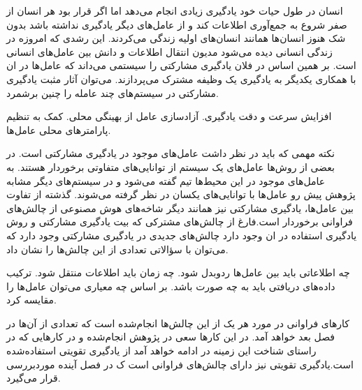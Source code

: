 انسان در طول حیات خود یادگیری زیادی انجام می‌دهد اما اگر قرار بود هر انسان از  صفر شروع به جمع‌آوری اطلاعات کند و از عامل‌های دیگر یادگیری نداشته باشد بدون شک هنوز انسان‌ها همانند انسان‌های اولیه زندگی می‌کردند. این رشدی که امروزه در زندگی انسانی دیده می‌شود مدیون انتقال اطلاعات و دانش بین عامل‌های انسانی است. بر همین اساس در فلان یادگیری مشارکتی را سیستمی می‌داند که عامل‌ها در ان با همکاری یکدیگر به یادگیری یک وظیفه مشترک می‌پردازند. می‌توان آثار مثبت یادگیری مشارکتی در سیستم‌های چند عامله را چنین برشمرد.

\begin{itemize}\setlength\itemsep{-.5em}
 افزایش سرعت و دقت یادگیری.
 آزادسازی عامل از بهینگی محلی.
 کمک به تنظیم پارامترهای محلی عامل‌ها.
\end{itemize}

نکته مهمی که باید در نظر داشت عامل‌های موجود در یادگیری مشارکتی است. در بعضی از روش‌ها عامل‌های یک سیستم از توانایی‌های متفاوتی برخوردار هستند. به عامل‌های موجود در این محیط‌ها تیم گفته می‌شود و در سیستم‌های دیگر مشابه پژوهش پیش رو عامل‌ها با توانایی‌های یکسان در نظر گرفته می‌شوند. گذشته از تفاوت بین عامل‌ها، یادگیری مشارکتی نیز همانند دیگر شاخه‌های هوش مصنوعی از چالش‌های فراوانی برخوردار است.فارغ از چالش‌های مشترکی که بیت یادگیری مشارکتی و روش یادگیری استفاده در ان وجود دارد چالش‌های جدیدی در یادگیری مشارکتی وجود دارد که می‌توان با سؤالاتی تعدادی از این چالش‌ها را نشان داد.

\begin{itemize}\setlength\itemsep{-.5em}
 چه اطلاعاتی باید بین عامل‌ها ردوبدل شود.
 چه زمان باید اطلاعات منتقل شود.
 ترکیب داده‌های دریافتی باید به چه صورت باشد.
 بر اساس چه معیاری می‌توان عامل‌ها را مقایسه کرد.
\end{itemize}

کارهای فراوانی در مورد هر یک از این چالش‌ها انجام‌شده است که تعدادی از آن‌ها در فصل بعد خواهد آمد. در این کارها سعی در پژوهش انجام‌شده و در کارهایی که در راستای شناخت این زمینه در ادامه خواهد آمد از یادگیری تقویتی استفاده‌شده است.یادگیری تقویتی نیز دارای چالش‌های فراوانی است ک در فصل آینده موردبررسی قرار می‌گیرد.